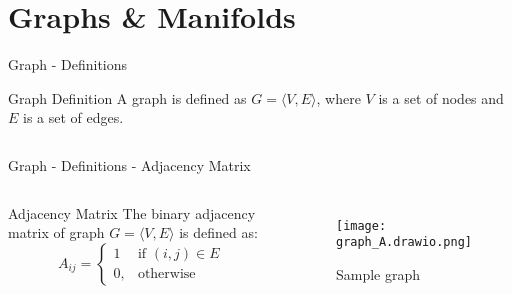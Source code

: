 
\section{Graphs \& Manifolds}

\begin{frame}{Graph - Definitions}
  \pause
  \begin{block}{Graph Definition}
    A graph is defined as $G = \langle V,E \rangle$, where $V$ is a set of 
    nodes and $E$ is a set of edges. 
  \end{block}


  \begin{columns}

    
    
  \end{columns}
\end{frame}

\begin{frame}{Graph - Definitions - Adjacency Matrix}
  \pause
  \begin{columns}

  \begin{block}{Adjacency Matrix}
    The binary adjacency matrix of graph $G = \langle V, E \rangle$ is defined as:
  \begin{equation}
      \label{eg:AdjacencyMatrix}
      A_{ij} =    
      \begin{cases}
          1  & \text{if } (i, j) \in E \\
          0, & \text{otherwise}
      \end{cases}
  \end{equation}
  \end{block}
  
  \begin{figure}
    \centering
    \texttt{[image: graph\_A.drawio.png]}
    \caption{Sample graph}        
  \end{figure}

\end{columns}

\end{frame}

